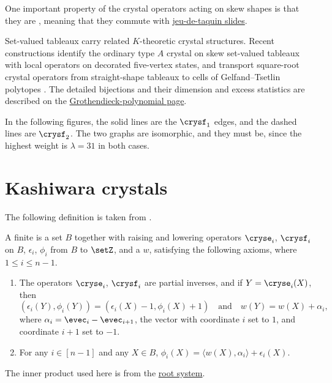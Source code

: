 One important property of the crystal operators acting on skew shapes is that
they are \label{coplacticCrystalOperator}, meaning that they
commute with \hyperref[jeuDeTaquin]{jeu-de-taquin slides}.

Set-valued tableaux carry related $K$-theoretic crystal structures.  Recent
constructions identify the ordinary type $A$ crystal on skew set-valued
tableaux with local operators on decorated five-vertex states, and transport
square-root crystal operators from straight-shape tableaux to cells of
Gelfand--Tsetlin polytopes
\cite{Shimazaki2026Crystals,Smirnov2026x}.  The detailed bijections and their
dimension and excess statistics are described on the
\hyperref[grothendieckTableauxGeometry]{Grothendieck-polynomial page}.


\begin{example*}
In the following figures, the solid lines are the $\crysf_1$ edges,
and the dashed lines are $\crysf_2$.
The two graphs are isomorphic, and they must be, since the highest weight is
$\lambda =31$ in both cases.
\begin{figure}
\end{figure}
\end{example*}



\section[kashiwaraCrystals]{Kashiwara crystals}

The following definition is taken from \cite{GillespieLevinson2019}.

A finite \label{glKashiwaraCrystal} is a set
$B$ together with raising and lowering operators $\cryse_i$, $\crysf_i$ on $B$,
\label{crystalLengthFunction} $\epsilon_i$, $\phi_i$
from $B$ to $\setZ$, and a \label{crystalWeightFunction}
$w$, satisfying the following axioms, where $1 \leq i \leq n-1$.
\begin{enumerate}
 \item The operators $\cryse_i$, $\crysf_i$ are partial inverses, and if
 $Y = \cryse_i(X)$, then
 \[
		\left(\epsilon_i(Y), \phi_i(Y)   \right)
      = \left( \epsilon_i(X)-1, \phi_i(X)+1 \right)
      \quad \text{and} \quad
		w(Y) = w(X)+ \alpha_i,
 \]
 where $\alpha_i = \evec_i - \evec_{i+1}$, the vector with coordinate $i$ set to $1$,
 and coordinate $i+1$ set to $-1$.
 \item For any $i \in [n-1]$ and any $X \in B$,
 $\phi_i(X) = \langle w(X), \alpha_i \rangle + \epsilon_i(X)$.
\end{enumerate}
The inner product used here is from the \hyperref[rootSystem]{root system}.

